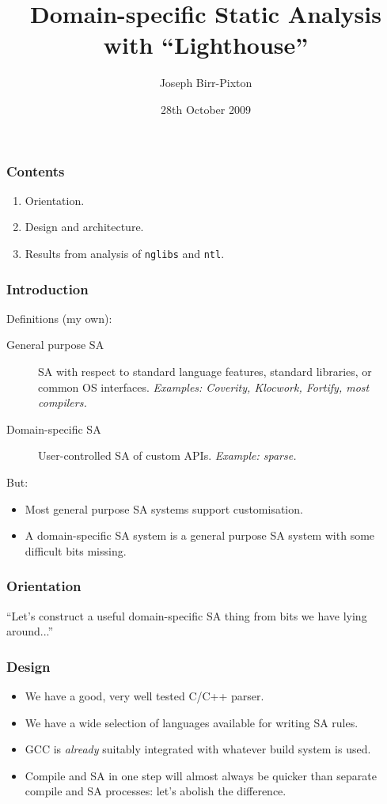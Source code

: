 \documentclass{beamer}
\title[lh]{Domain-specific Static Analysis with ``Lighthouse''}
\author{Joseph Birr-Pixton}
\date{28th October 2009}
\begin{document}
\frame{\titlepage}

\frame
{
  \frametitle{Contents}

  \begin{enumerate}
    \item<1> Orientation.
    \item<2> Design and architecture.
    \item<3> Results from analysis of \texttt{nglibs} and \texttt{ntl}.
  \end{enumerate}
}

\frame
{
  \frametitle{Introduction}
  Definitions (my own):

  \begin{description}
    \item[General purpose SA] SA with respect to standard language features,
                              standard libraries, or common OS interfaces.
                              \textit{Examples: Coverity, Klocwork, Fortify, most compilers.}
    \item[Domain-specific SA] User-controlled SA of custom APIs.
                              \textit{Example: sparse.}
  \end{description}

  But:

  \begin{itemize}
  \item<2-> Most general purpose SA systems support customisation.
  \item<3-> A domain-specific SA system is a general purpose SA system with some difficult bits missing.
  \end{itemize}
}

\frame
{
  \frametitle{Orientation}

  ``Let's construct a useful domain-specific SA thing from bits we have lying around...''
}

\frame
{
  \frametitle{Design}

  \begin{itemize}
  \item<1-> We have a good, very well tested C/C++ parser.  
  \item<3-> We have a wide selection of languages available for writing SA rules.  
  \item<5-> GCC is \emph{already} suitably integrated with whatever build system is used.
  \item<6-> Compile and SA in one step will almost always be quicker than separate compile and SA processes: let's abolish the difference.
  \end{itemize}
}
\end{document}

